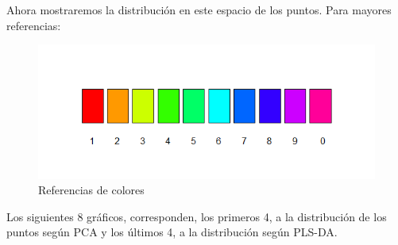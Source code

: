 Ahora mostraremos la distribuci\'on en este espacio de los puntos. Para mayores referencias:

\begin{figure}[h!]
  \begin{center}
	\includegraphics[scale=0.6]{exp5/AllVsAll/Referencias}
	\caption{Referencias de colores}
  \end{center}
\end{figure}

Los siguientes 8 gr\'aficos, corresponden, los primeros 4, a la distribuci\'on de los puntos seg\'un PCA y los \'ultimos 4, a la distribuci\'on seg\'un PLS-DA.

